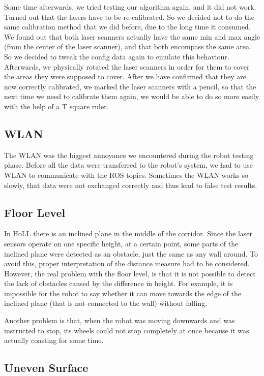 Some time afterwards, we tried testing our algorithm again, and it did not work. Turned out that the lasers have to be re-calibrated. So we decided not to do the same calibration method that we did before, due to the long time it consumed. We found out that both laser scanners actually have the same min and max angle (from the center of the laser scanner), and that both encompass the same area. So we decided to tweak the config data again to emulate this behaviour. Afterwards, we physically rotated the laser scanners in order for them to cover the areas they were supposed to cover. After we have confirmed that they are now correctly calibrated, we marked the laser scanners with a pencil, so that the next time we need to calibrate them again, we would be able to do so more easily with the help of a T square ruler. 

\subsection{WLAN}

The WLAN was the biggest annoyance we encountered during the robot testing phase. Before all the data were transferred to the robot's system, we had to use WLAN to communicate with the ROS topics. Sometimes the WLAN works so slowly, that data were not exchanged correctly and thus lead to false test results.

\subsection{Floor Level}

In HoLL there is an inclined plane in the middle of the corridor. Since the laser sensors operate on one specific height, at a certain point, some parts of the inclined plane were detected as an obstacle, just the same as any wall around. To avoid this, proper interpretation of the distance measure had to be considered. However, the real problem with the floor level, is that it is not possible to detect the lack of obstacles caused by the difference in height. For example, it is impossible for the robot to say whether it can move towards the edge of the inclined plane (that is not connected to the wall) without falling.

Another problem is that, when the robot was moving downwards and was instructed to stop, its wheels could not stop completely at once because it was actually coasting for some time.

\subsection{Uneven Surface}

